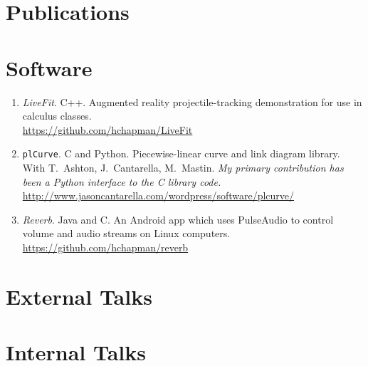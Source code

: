 \documentclass[letterpaper]{article}
\begin{document}
\section*{Publications}

\nocite{*}
\printbibliography[heading=none]
\vspace{-.5em}
\nocite{*}
\printbibliography[heading=none]

\section*{Software}

\begin{enumerate}
\item \emph{LiveFit}. C++. Augmented reality projectile-tracking demonstration
  for use in calculus classes. \\
  \url{https://github.com/hchapman/LiveFit}
\item \texttt{plCurve}. C and Python. Piecewise-linear curve and link diagram library.\\
  With T.\ Ashton, J.\ Cantarella, M.\ Mastin.
  \textit{My primary contribution has been a Python interface to the C
    library code.} \\
  \url{http://www.jasoncantarella.com/wordpress/software/plcurve/}
\item \emph{Reverb}. Java and C. An Android app which uses PulseAudio to
  control volume and audio streams on Linux computers. \\
  \url{https://github.com/hchapman/reverb}
\end{enumerate}

\section*{External Talks}

\nocite{*}
\printbibliography[heading=none,subtype=external,resetnumbers=true]

\section*{Internal Talks}

\nocite{*}
\printbibliography[heading=none,subtype=internal]
\end{document}
